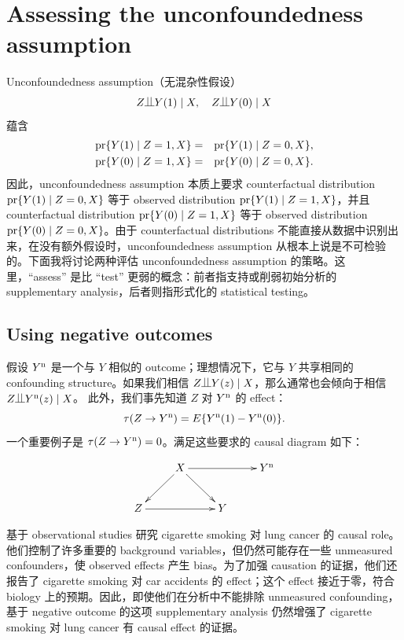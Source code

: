 \section{Assessing the unconfoundedness assumption}


Unconfoundedness assumption（无混杂性假设）
$$
Z\ind Y(1) \mid X, \quad 
Z\ind Y(0) \mid X
$$
蕴含
\begin{eqnarray*}
\textup{pr}\{ Y(1)\mid  Z=1, X \}  &=& \textup{pr}\{ Y(1)\mid  Z=0, X \} , \\
\textup{pr}\{ Y(0)\mid  Z=1, X \} &=& \textup{pr}\{ Y(0)\mid  Z=0, X \} . 
\end{eqnarray*}
因此，unconfoundedness assumption 本质上要求 counterfactual distribution $\textup{pr}\{ Y(1)\mid  Z=0, X \}$ 等于 observed distribution
$\textup{pr}\{ Y(1)\mid  Z=1, X \}$，并且 counterfactual distribution $\textup{pr}\{ Y(0)\mid  Z=1, X \} $ 等于 observed distribution $\textup{pr}\{ Y(0)\mid  Z=0, X \}$。由于 counterfactual distributions 不能直接从数据中识别出来，在没有额外假设时，unconfoundedness assumption 从根本上说是不可检验的。下面我将讨论两种评估 unconfoundedness assumption 的策略。这里，``assess'' 是比 ``test'' 更弱的概念：前者指支持或削弱初始分析的 supplementary analysis，后者则指形式化的 statistical testing。



\subsection{Using negative outcomes}


 

假设 $Y^\textup{n}$ 是一个与 $Y$ 相似的 outcome；理想情况下，它与 $Y$ 共享相同的 confounding structure。如果我们相信 $Z\ind Y(z)\mid X$，那么通常也会倾向于相信 $Z\ind Y^\textup{n} (z)\mid X$。
此外，我们事先知道 $Z$ 对 $Y^\textup{n}$ 的 effect：
$$
\tau(Z\rightarrow Y^\textup{n} )
= 
E\{  Y^\textup{n}(1) - Y^\textup{n}(0) \} .
$$
一个重要例子是 $\tau(Z\rightarrow Y^\textup{n} ) = 0$。满足这些要求的 causal diagram 如下：

$$
\xymatrix{
 & X \ar[ld]\ar[rd] \ar[rr] & & Y^\textup{n}  \\
Z\ar[rr] &&Y 
}
$$



\begin{example}
\citet{Cornfield::1959} 基于 observational studies 研究 cigarette smoking 对 lung cancer 的 causal role。他们控制了许多重要的 background variables，但仍然可能存在一些 unmeasured confounders，使 observed effects 产生 bias。为了加强 causation 的证据，他们还报告了 cigarette smoking 对 car accidents 的 effect；这个 effect 接近于零，符合 biology 上的预期。因此，即使他们在分析中不能排除 unmeasured confounding，基于 negative outcome 的这项 supplementary analysis 仍然增强了 cigarette smoking 对 lung cancer 有 causal effect 的证据。
\end{example}

